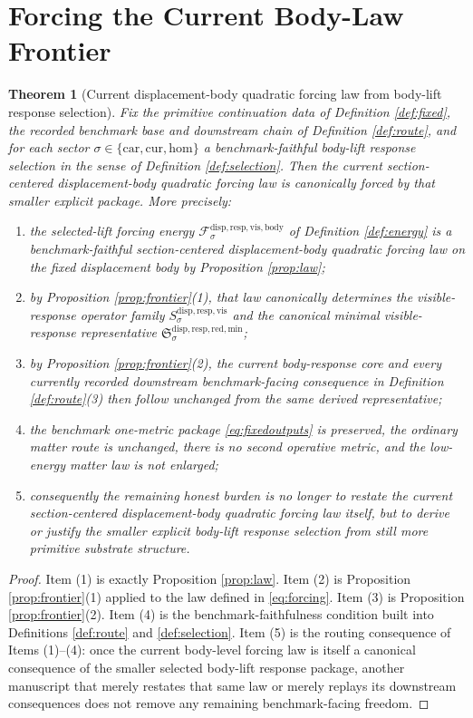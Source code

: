 \documentclass[11pt]{article}
\newcommand{\Car}{\mathrm{car}}
\newcommand{\Cur}{\mathrm{cur}}
\newcommand{\Hom}{\mathrm{hom}}
\newcommand{\VisibleBodyForcingLaw}[1]{\mathscr F_{#1}^{\mathrm{disp,resp,vis,body}}}
\newcommand{\VisibleResponseOperator}[1]{S_{#1}^{\mathrm{disp,resp,vis}}}
\newcommand{\MinimalReducedStructure}{\mathfrak S^{\mathrm{disp,resp,red,min}}}
\newtheorem{theorem}{Theorem}
\begin{document}
\section{Forcing the Current Body-Law Frontier}

\begin{theorem}[Current displacement-body quadratic forcing law from body-lift response selection]
\label{thm:main}
Fix the primitive continuation data of Definition \ref{def:fixed}, the recorded benchmark base and downstream chain of Definition \ref{def:route}, and for each sector \(\sigma\in\{\Car,\Cur,\Hom\}\) a benchmark-faithful body-lift response selection in the sense of Definition \ref{def:selection}. Then the current section-centered displacement-body quadratic forcing law is canonically forced by that smaller explicit package. More precisely:
\begin{enumerate}
    \item the selected-lift forcing energy \(\VisibleBodyForcingLaw{\sigma}\) of Definition \ref{def:energy} is a benchmark-faithful section-centered displacement-body quadratic forcing law on the fixed displacement body by Proposition \ref{prop:law};
    \item by Proposition \ref{prop:frontier}(1), that law canonically determines the visible-response operator family \(\VisibleResponseOperator{\sigma}\) and the canonical minimal visible-response representative \(\MinimalReducedStructure_{\sigma}\);
    \item by Proposition \ref{prop:frontier}(2), the current body-response core and every currently recorded downstream benchmark-facing consequence in Definition \ref{def:route}(3) then follow unchanged from the same derived representative;
    \item the benchmark one-metric package \eqref{eq:fixedoutputs} is preserved, the ordinary matter route is unchanged, there is no second operative metric, and the low-energy matter law is not enlarged;
    \item consequently the remaining honest burden is no longer to restate the current section-centered displacement-body quadratic forcing law itself, but to derive or justify the smaller explicit body-lift response selection from still more primitive substrate structure.
\end{enumerate}
\end{theorem}

\begin{proof}
Item (1) is exactly Proposition \ref{prop:law}. Item (2) is Proposition \ref{prop:frontier}(1) applied to the law defined in \eqref{eq:forcing}. Item (3) is Proposition \ref{prop:frontier}(2). Item (4) is the benchmark-faithfulness condition built into Definitions \ref{def:route} and \ref{def:selection}. Item (5) is the routing consequence of Items (1)--(4): once the current body-level forcing law is itself a canonical consequence of the smaller selected body-lift response package, another manuscript that merely restates that same law or merely replays its downstream consequences does not remove any remaining benchmark-facing freedom.
\end{proof}
\end{document}
